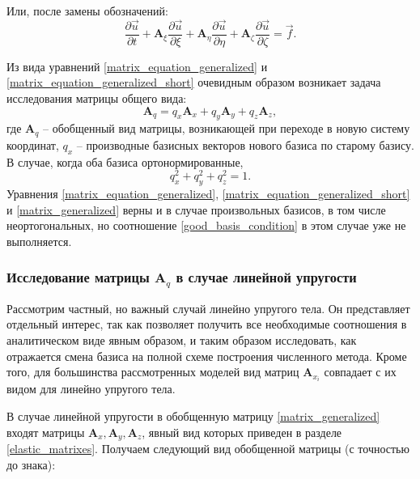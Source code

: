 Или, после замены обозначений:
\begin{equation}
\label{matrix_equation_generalized_short}
\frac{\partial\vec{u}}{\partial{t}} + \mathbf{A}_\xi \frac{\partial\vec{u}}{\partial{\xi}} + 
\mathbf{A}_\eta \frac{\partial\vec{u}}{\partial{\eta}} + \mathbf{A}_\zeta \frac{\partial\vec{u}}{\partial{\zeta}} = \vec f.
\end{equation}

Из вида уравнений \ref{matrix_equation_generalized} и \ref{matrix_equation_generalized_short} очевидным образом возникает задача исследования матрицы общего вида:
\begin{equation}
\label{matrix_generalized}
\mathbf{A}_q = q_x \mathbf{A}_x  + q_y \mathbf{A}_y + q_z \mathbf{A}_z,
\end{equation}
где $\mathbf{A}_q$ -- обобщенный вид матрицы, возникающей при переходе в новую систему координат, $q_x$ -- производные базисных векторов нового базиса по старому базису. В случае, когда оба базиса ортонормированные,
\begin{equation}
\label{good_basis_condition}
q_x^2 + q_y^2 + q_z^2 = 1.
\end{equation}
Уравнения \ref{matrix_equation_generalized}, \ref{matrix_equation_generalized_short} и \ref{matrix_generalized} верны и в случае произвольных базисов, в том числе неортогональных, но соотношение \ref{good_basis_condition} в этом случае уже не выполняется.

\subsubsection{Исследование матрицы $\mathbf{A}_q$ в случае линейной упругости}

Рассмотрим частный, но важный случай линейно упругого тела. Он представляет отдельный интерес, так как позволяет получить все необходимые соотношения в аналитическом виде явным образом, и таким образом исследовать, как отражается смена базиса на полной схеме построения численного метода. Кроме того, для большинства рассмотренных моделей вид матриц $\mathbf A_{x_i}$ совпадает с их видом для линейно упругого тела.

В случае линейной упругости в обобщенную матрицу \ref{matrix_generalized} входят матрицы $\mathbf{A}_x, \mathbf{A}_y, \mathbf{A}_z$, явный вид которых приведен в разделе \ref{elastic_matrixes}. Получаем следующий вид обобщенной матрицы (с точностью до знака):


